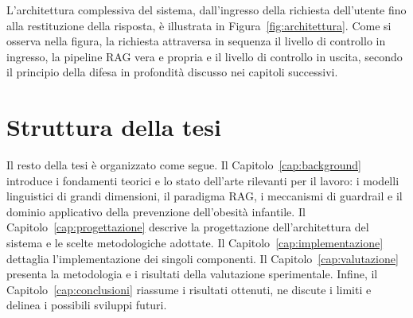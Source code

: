 L'architettura complessiva del sistema, dall'ingresso della richiesta dell'utente
fino alla restituzione della risposta, \`e illustrata in
Figura~\ref{fig:architettura}. Come si osserva nella figura, la richiesta
attraversa in sequenza il livello di controllo in ingresso, la pipeline RAG vera
e propria e il livello di controllo in uscita, secondo il principio della difesa
in profondit\`a discusso nei capitoli successivi.


\section{Struttura della tesi}
\label{sec:struttura}

Il resto della tesi \`e organizzato come segue. Il
Capitolo~\ref{cap:background} introduce i fondamenti teorici e lo stato
dell'arte rilevanti per il lavoro: i modelli linguistici di grandi dimensioni,
il paradigma RAG, i meccanismi di guardrail e il dominio applicativo della
prevenzione dell'obesit\`a infantile. Il Capitolo~\ref{cap:progettazione}
descrive la progettazione dell'architettura del sistema e le scelte
metodologiche adottate. Il Capitolo~\ref{cap:implementazione} dettaglia
l'implementazione dei singoli componenti. Il Capitolo~\ref{cap:valutazione}
presenta la metodologia e i risultati della valutazione sperimentale. Infine,
il Capitolo~\ref{cap:conclusioni} riassume i risultati ottenuti, ne discute i
limiti e delinea i possibili sviluppi futuri.

%
